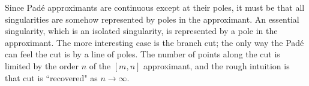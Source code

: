 Since Pad\'e approximants are continuous except at their poles, it must be that
all singularities are somehow represented by poles in the approximant. An
essential singularity, which is an isolated singularity, is represented by a
pole in the approximant. The more interesting case is the branch cut; the only
way the Pad\'e can feel the cut is by a line of poles. The number of points
along the cut is limited by the order $n$ of the $[m,n]$ approximant, and the
rough intuition is that cut is ``recovered" as $n\to\infty$.





